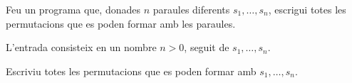 

\Statement

Feu un programa que,
donades $n$ paraules diferents $s_1, \dots, s_n$,
escrigui totes les permutacions que es poden formar amb les paraules.


\Input

L'entrada consisteix en un nombre $n > 0$,
seguit de $s_1, \dots, s_n$.


\Output

Escriviu totes les permutacions que es poden formar amb $s_1, \dots, s_n$.


\ObservationElastic


\Sample
